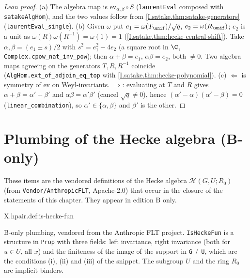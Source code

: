 \begin{proof}[Lean proof]
(a) The algebra map is $\mathrm{ev}_{\alpha,\beta}\circ S$ (\texttt{laurentEval} composed with \texttt{satakeAlgHom}), and the two values follow from \cref{I.satake.thm:satake-generators} (\texttt{laurentEval\_single}). (b) Given $\omega$ put $e_1=\omega(T_\unif)/\sqrt q$, $e_2=\omega(R_\unif)$; $e_2$ is a unit as $\omega(R)\omega(R^{-1})=\omega(1)=1$ (\cref{I.satake.thm:hecke-central-shift}). Take $\alpha,\beta=(e_1\pm s)/2$ with $s^2=e_1^2-4e_2$ (a square root in $\C$, \texttt{Complex.cpow\_nat\_inv\_pow}); then $\alpha+\beta=e_1$, $\alpha\beta=e_2$, both $\ne0$. Two algebra maps agreeing on the generators $T,R,R^{-1}$ coincide (\texttt{AlgHom.ext\_of\_adjoin\_eq\_top} with \cref{I.satake.thm:hecke-polynomial}). (c) $\Leftarrow$ is symmetry of $\mathrm{ev}$ on Weyl-invariants. $\Rightarrow$: evaluating at $T$ and $R$ gives $\alpha+\beta=\alpha'+\beta'$ and $\alpha\beta=\alpha'\beta'$ (cancel $\sqrt q\ne0$), hence $(\alpha'-\alpha)(\alpha'-\beta)=0$ (\texttt{linear\_combination}), so $\alpha'\in\{\alpha,\beta\}$ and $\beta'$ is the other.
\end{proof}

\section{Plumbing of the Hecke algebra (B-only)}

\noindent These items are the vendored definitions of the Hecke algebra $\mathcal H(G,U;R_0)$ (from \texttt{Vendor/AnthropicFLT}, Apache-2.0) that occur in the closure of the statements of this chapter. They appear in edition B only.

\begin{definition}
\bonly
{}
\end{definition}
\begin{tfformal}{X.hpair.def:is-hecke-fun}
\begin{tffidelity}
B-only plumbing, vendored from the Anthropic FLT project. \texttt{IsHeckeFun} is a structure in \texttt{Prop} with three fields: left invariance, right invariance (both for $u\in U$, all $x$) and the finiteness of the image of the support in \texttt{G ⧸ U}, which are the conditions (i), (ii) and (iii) of the snippet. The subgroup $U$ and the ring $R_0$ are implicit binders.
\end{tffidelity}
\end{tfformal}


